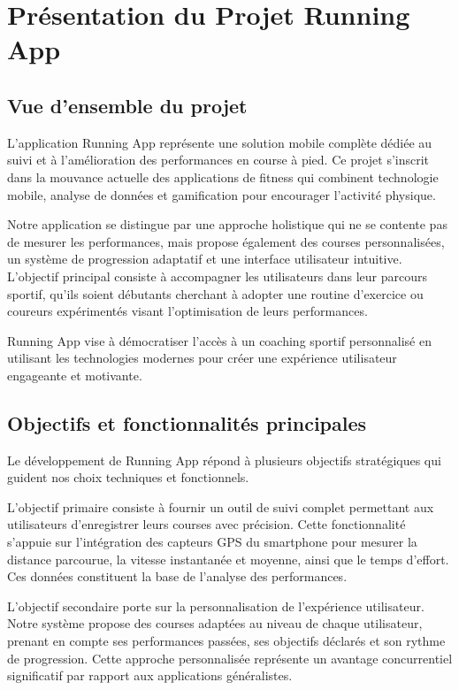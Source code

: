 \section{Présentation du Projet Running App}

\subsection{Vue d'ensemble du projet}

L'application Running App représente une solution mobile complète dédiée au suivi et à l'amélioration des performances en course à pied. Ce projet s'inscrit dans la mouvance actuelle des applications de fitness qui combinent technologie mobile, analyse de données et gamification pour encourager l'activité physique.

Notre application se distingue par une approche holistique qui ne se contente pas de mesurer les performances, mais propose également des courses personnalisées, un système de progression adaptatif et une interface utilisateur intuitive. L'objectif principal consiste à accompagner les utilisateurs dans leur parcours sportif, qu'ils soient débutants cherchant à adopter une routine d'exercice ou coureurs expérimentés visant l'optimisation de leurs performances.

\begin{infobox}
Running App vise à démocratiser l'accès à un coaching sportif personnalisé en utilisant les technologies modernes pour créer une expérience utilisateur engageante et motivante.
\end{infobox}

\subsection{Objectifs et fonctionnalités principales}

Le développement de Running App répond à plusieurs objectifs stratégiques qui guident nos choix techniques et fonctionnels.

L'objectif primaire consiste à fournir un outil de suivi complet permettant aux utilisateurs d'enregistrer leurs courses avec précision. Cette fonctionnalité s'appuie sur l'intégration des capteurs GPS du smartphone pour mesurer la distance parcourue, la vitesse instantanée et moyenne, ainsi que le temps d'effort. Ces données constituent la base de l'analyse des performances.

L'objectif secondaire porte sur la personnalisation de l'expérience utilisateur. Notre système propose des courses adaptées au niveau de chaque utilisateur, prenant en compte ses performances passées, ses objectifs déclarés et son rythme de progression. Cette approche personnalisée représente un avantage concurrentiel significatif par rapport aux applications généralistes.

